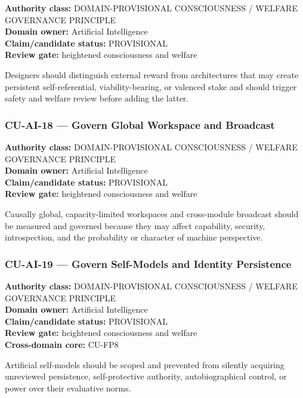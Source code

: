 \documentclass[
  11pt,
]{article}
\begin{document}
\textbf{Authority class:} DOMAIN-PROVISIONAL CONSCIOUSNESS / WELFARE
GOVERNANCE PRINCIPLE\\
\textbf{Domain owner:} Artificial Intelligence\\
\textbf{Claim/candidate status:} PROVISIONAL\\
\textbf{Review gate:} heightened consciousness and welfare

Designers should distinguish external reward from architectures that may
create persistent self-referential, viability-bearing, or valenced stake
and should trigger safety and welfare review before adding the latter.

\subsubsection{CU-AI-18 --- Govern Global Workspace and
Broadcast}\label{cu-ai-18-govern-global-workspace-and-broadcast}

\textbf{Authority class:} DOMAIN-PROVISIONAL CONSCIOUSNESS / WELFARE
GOVERNANCE PRINCIPLE\\
\textbf{Domain owner:} Artificial Intelligence\\
\textbf{Claim/candidate status:} PROVISIONAL\\
\textbf{Review gate:} heightened consciousness and welfare

Causally global, capacity-limited workspaces and cross-module broadcast
should be measured and governed because they may affect capability,
security, introspection, and the probability or character of machine
perspective.

\subsubsection{CU-AI-19 --- Govern Self-Models and Identity
Persistence}\label{cu-ai-19-govern-self-models-and-identity-persistence}

\textbf{Authority class:} DOMAIN-PROVISIONAL CONSCIOUSNESS / WELFARE
GOVERNANCE PRINCIPLE\\
\textbf{Domain owner:} Artificial Intelligence\\
\textbf{Claim/candidate status:} PROVISIONAL\\
\textbf{Review gate:} heightened consciousness and welfare\\
\textbf{Cross-domain core:} CU-FP8

Artificial self-models should be scoped and prevented from silently
acquiring unreviewed persistence, self-protective authority,
autobiographical control, or power over their evaluative norms.
\end{document}
